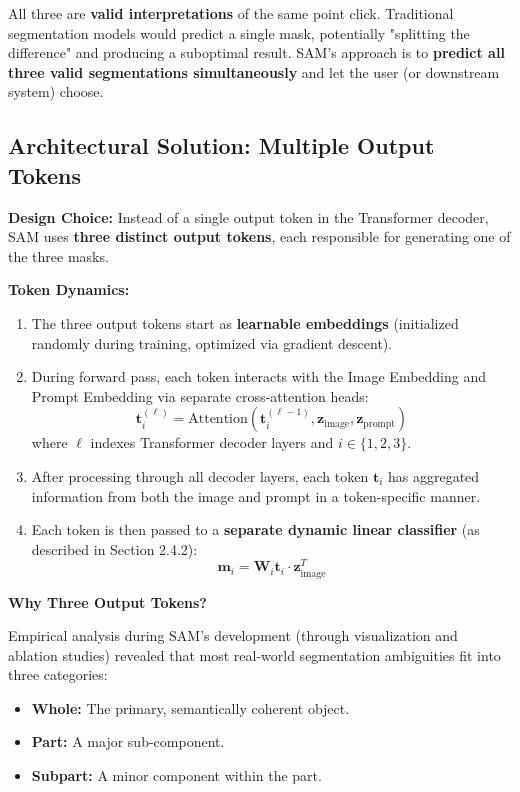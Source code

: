 All three are \textbf{valid interpretations} of the same point click. Traditional segmentation models would predict a single mask, potentially "splitting the difference" and producing a suboptimal result. SAM's approach is to \textbf{predict all three valid segmentations simultaneously} and let the user (or downstream system) choose.

\subsection{Architectural Solution: Multiple Output Tokens}

\textbf{Design Choice:} Instead of a single output token in the Transformer decoder, SAM uses \textbf{three distinct output tokens}, each responsible for generating one of the three masks.

\textbf{Token Dynamics:}

\begin{enumerate}
    \item The three output tokens start as \textbf{learnable embeddings} (initialized randomly during training, optimized via gradient descent).
    \item During forward pass, each token interacts with the Image Embedding and Prompt Embedding via separate cross-attention heads:
       \[ \mathbf{t}_i^{(\ell)} = \text{Attention}(\mathbf{t}_i^{(\ell-1)}, \mathbf{z}_{\text{image}}, \mathbf{z}_{\text{prompt}}) \]
       where $\ell$ indexes Transformer decoder layers and $i \in \{1, 2, 3\}$.

    \item After processing through all decoder layers, each token $\mathbf{t}_i$ has aggregated information from both the image and prompt in a token-specific manner.

    \item Each token is then passed to a \textbf{separate dynamic linear classifier} (as described in Section 2.4.2):
       \[ \mathbf{m}_i = \mathbf{W}_i \mathbf{t}_i \cdot \mathbf{z}_{\text{image}}^T \]
\end{enumerate}

\textbf{Why Three Output Tokens?}

Empirical analysis during SAM's development (through visualization and ablation studies) revealed that most real-world segmentation ambiguities fit into three categories:
\begin{itemize}
    \item \textbf{Whole:} The primary, semantically coherent object.
    \item \textbf{Part:} A major sub-component.
    \item \textbf{Subpart:} A minor component within the part.
\end{itemize}

